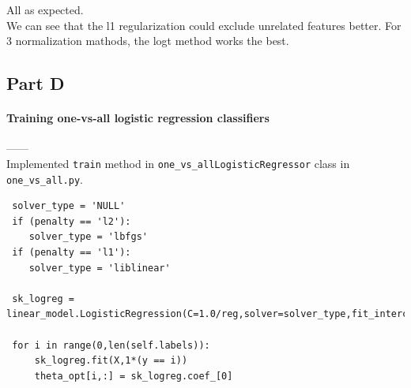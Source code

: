 \documentclass{article}
\begin{document}
\begin{tiny}
\begin{lstlisting}
\end{lstlisting}
\end{tiny}

All as expected. \\
We can see that the l1 regularization could exclude unrelated features better. For 3 normalization mathods, the logt method works the best.

\subsection{Part D}
\paragraph{Training one-vs-all logistic regression classifiers\\}
------\\
Implemented \verb|train| method in \verb|one_vs_allLogisticRegressor| class in \verb|one_vs_all.py|.
\begin{tiny}
\begin{lstlisting}
 solver_type = 'NULL'
 if (penalty == 'l2'):
    solver_type = 'lbfgs'
 if (penalty == 'l1'):
    solver_type = 'liblinear'
            
 sk_logreg = linear_model.LogisticRegression(C=1.0/reg,solver=solver_type,fit_intercept=False)
        
 for i in range(0,len(self.labels)):
     sk_logreg.fit(X,1*(y == i))
     theta_opt[i,:] = sk_logreg.coef_[0]
\end{lstlisting}
\end{tiny}
\end{document}
